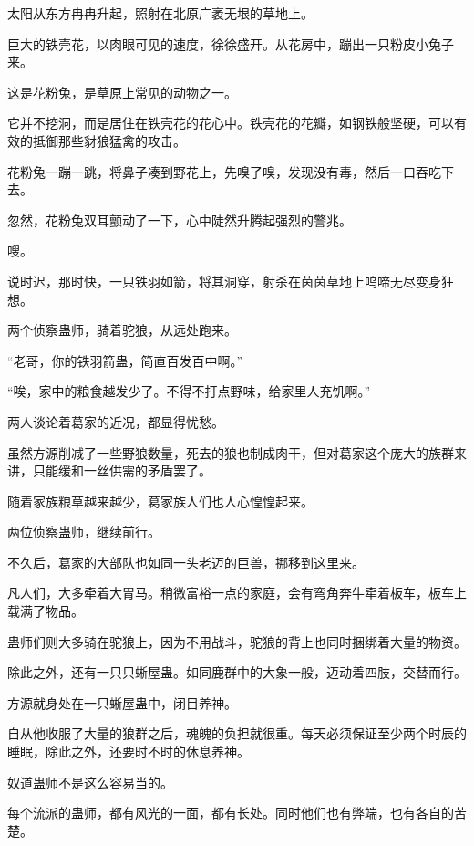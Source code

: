 
\begin{this_body}



太阳从东方冉冉升起，照射在北原广袤无垠的草地上。

巨大的铁壳花，以肉眼可见的速度，徐徐盛开。从花房中，蹦出一只粉皮小兔子来。

这是花粉兔，是草原上常见的动物之一。

它并不挖洞，而是居住在铁壳花的花心中。铁壳花的花瓣，如钢铁般坚硬，可以有效的抵御那些豺狼猛禽的攻击。

花粉兔一蹦一跳，将鼻子凑到野花上，先嗅了嗅，发现没有毒，然后一口吞吃下去。

忽然，花粉兔双耳颤动了一下，心中陡然升腾起强烈的警兆。

嗖。

说时迟，那时快，一只铁羽如箭，将其洞穿，射杀在茵茵草地上呜啼无尽变身狂想。

两个侦察蛊师，骑着驼狼，从远处跑来。

“老哥，你的铁羽箭蛊，简直百发百中啊。”

“唉，家中的粮食越发少了。不得不打点野味，给家里人充饥啊。”

两人谈论着葛家的近况，都显得忧愁。

虽然方源削减了一些野狼数量，死去的狼也制成肉干，但对葛家这个庞大的族群来讲，只能缓和一丝供需的矛盾罢了。

随着家族粮草越来越少，葛家族人们也人心惶惶起来。

两位侦察蛊师，继续前行。

不久后，葛家的大部队也如同一头老迈的巨兽，挪移到这里来。

凡人们，大多牵着大胃马。稍微富裕一点的家庭，会有弯角奔牛牵着板车，板车上载满了物品。

蛊师们则大多骑在驼狼上，因为不用战斗，驼狼的背上也同时捆绑着大量的物资。

除此之外，还有一只只蜥屋蛊。如同鹿群中的大象一般，迈动着四肢，交替而行。

方源就身处在一只蜥屋蛊中，闭目养神。

自从他收服了大量的狼群之后，魂魄的负担就很重。每天必须保证至少两个时辰的睡眠，除此之外，还要时不时的休息养神。

奴道蛊师不是这么容易当的。

每个流派的蛊师，都有风光的一面，都有长处。同时他们也有弊端，也有各自的苦楚。


\end{this_body}
